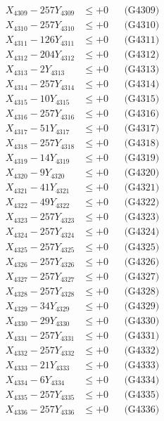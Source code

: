 \documentclass[a4paper,10pt]{article}
\begin{document}
{\begin{align}
X_{4309} - 257Y_{4309} &\leq +0 && \text{(G4309)} \\
X_{4310} - 257Y_{4310} &\leq +0 && \text{(G4310)} \\
\allowbreak
X_{4311} - 126Y_{4311} &\leq +0 && \text{(G4311)} \\
X_{4312} - 204Y_{4312} &\leq +0 && \text{(G4312)} \\
X_{4313} - 2Y_{4313} &\leq +0 && \text{(G4313)} \\
X_{4314} - 257Y_{4314} &\leq +0 && \text{(G4314)} \\
X_{4315} - 10Y_{4315} &\leq +0 && \text{(G4315)} \\
X_{4316} - 257Y_{4316} &\leq +0 && \text{(G4316)} \\
X_{4317} - 51Y_{4317} &\leq +0 && \text{(G4317)} \\
X_{4318} - 257Y_{4318} &\leq +0 && \text{(G4318)} \\
X_{4319} - 14Y_{4319} &\leq +0 && \text{(G4319)} \\
X_{4320} - 9Y_{4320} &\leq +0 && \text{(G4320)} \\
\allowbreak
X_{4321} - 41Y_{4321} &\leq +0 && \text{(G4321)} \\
X_{4322} - 49Y_{4322} &\leq +0 && \text{(G4322)} \\
X_{4323} - 257Y_{4323} &\leq +0 && \text{(G4323)} \\
X_{4324} - 257Y_{4324} &\leq +0 && \text{(G4324)} \\
X_{4325} - 257Y_{4325} &\leq +0 && \text{(G4325)} \\
X_{4326} - 257Y_{4326} &\leq +0 && \text{(G4326)} \\
X_{4327} - 257Y_{4327} &\leq +0 && \text{(G4327)} \\
X_{4328} - 257Y_{4328} &\leq +0 && \text{(G4328)} \\
X_{4329} - 34Y_{4329} &\leq +0 && \text{(G4329)} \\
X_{4330} - 29Y_{4330} &\leq +0 && \text{(G4330)} \\
\allowbreak
X_{4331} - 257Y_{4331} &\leq +0 && \text{(G4331)} \\
X_{4332} - 257Y_{4332} &\leq +0 && \text{(G4332)} \\
X_{4333} - 21Y_{4333} &\leq +0 && \text{(G4333)} \\
X_{4334} - 6Y_{4334} &\leq +0 && \text{(G4334)} \\
X_{4335} - 257Y_{4335} &\leq +0 && \text{(G4335)} \\
X_{4336} - 257Y_{4336} &\leq +0 && \text{(G4336)} \\

\end{align}}
\end{document}
